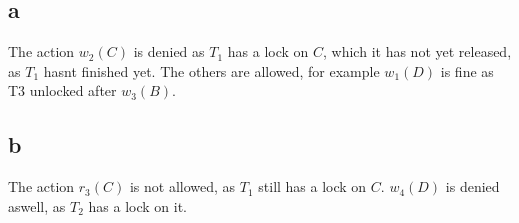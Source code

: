 \documentclass[working, oneside]{../../Preambles/tuftebook}
\begin{document}
\subsection*{a}
The action $w_{2}\left( C \right) $ is denied as $T_1$ has a lock on $C$, which it has not yet released, as $T_1$ hasnt finished yet. The others are allowed, for example $w_1\left( D \right) $ is fine as T3 unlocked after $w_3\left( B \right) $.
\subsection*{b}
The action $r_3\left( C \right) $ is not allowed, as $T_1$ still has a lock on $C$. $w_4\left( D \right) $ is denied aswell, as $T_2$ has a lock on it.
\end{document}

